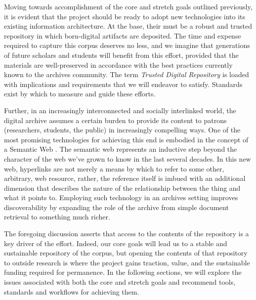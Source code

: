 Moving towards accomplishment of the core and stretch goals outlined previously, it is evident that the project should be ready to adopt new technologies into its existing information architecture. At the base, their must be a robust and trusted repository in which born-digital artifacts are deposited. The time and expense required to capture this corpus deserves no less, and we imagine that generations of future scholars and students will benefit from this effort, provided that the materials are well-preserved in accordance with the best practices currently known to the archives community. The term \emph{Trusted Digital Repository} is loaded with implications and requirements that we will endeavor to satisfy. Standards exist  by which to measure and guide these efforts.

Further, in an increasingly interconnected and socially interlinked world, the digital archive assumes a certain burden to provide its content to patrons (researchers, students, the public) in increasingly compelling ways. One of the most promising technologies for achieving this end is embodied in the concept of a Semantic Web \needcite[TBL]. The semantic web represents an inductive step beyond the character of the web we've grown to know in the last several decades. In this new web, hyperlinks are not merely a means by which to refer to some other, arbitrary, web resource, rather, the reference itself is imbued with an additional dimension that describes the nature of the relationship between the thing and what it points to. \needcite[Barthes?] Employing such technology in an archives setting improves discoverability by expanding the role of the archive from simple document retrieval to something much richer.

The foregoing discussion asserts that access to the contents of the repository is a key driver of the effort. Indeed, our core goals will lead us to a stable and sustainable repository of the corpus, but opening the contents of that repository to outside research is where the project gains traction, value, and the sustainable funding required for permanence. In the following sections, we will explore the issues associated with both the core and stretch goals and recommend tools, standards and workflows for achieving them.